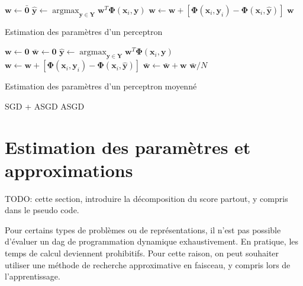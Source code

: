 \documentclass[11pt,openany]{book}
\newcommand{\ac}[1]{{\sc #1}} %
\begin{document}
\begin{algorithm}[htbp]
\begin{algorithmic}[1]
\State $\mathbf{w} \gets \bar{\mathbf{0}}$
\State
$\hat{\mathbf{y}} \gets \mathop{\text{argmax}}_{\mathbf{y}\in \mathbf{Y}} \mathbf{w}^T \boldsymbol\Phi(\mathbf{x}_i,\mathbf{y})$
\label{algoline-pseudoargmax}
     \State $\mathbf{w} \gets  \mathbf{w} +
     \left[\boldsymbol\Phi(\mathbf{x}_i,\mathbf{y}_i) 
       - \boldsymbol\Phi(\mathbf{x}_i,\hat{\mathbf{y}})  \right]$ 
     \label{algoline-update}
\EndIf
\EndFor
\EndFor
\State \Return $\mathbf{w}$
\EndFunction
\end{algorithmic}
\caption{\label{algo-perceptron-train}Estimation des paramètres d'un
  perceptron}
\end{algorithm}


\begin{algorithm}[htbp]
\begin{algorithmic}[1]
\State $\mathbf{w} \gets \mathbf{0}$
\State $\bar{\mathbf{w}} \gets \mathbf{0}$
\State $\hat{\mathbf{y}} \gets \mathop{\text{argmax}}_{\mathbf{y}\in \mathbf{Y}} \mathbf{w}^T \boldsymbol\Phi(\mathbf{x}_i,\mathbf{y})$
     \State $\mathbf{w} \gets  \mathbf{w} +
     \left[\boldsymbol\Phi(\mathbf{x}_i,\mathbf{y}_i) 
       - \boldsymbol\Phi(\mathbf{x}_i,\hat{\mathbf{y}})  \right]$ 
\EndIf
\State $\bar{\mathbf{w}} \gets \bar{\mathbf{w}}+\mathbf{w}$
\EndFor
\EndFor
\State \Return $\bar{\mathbf{w}}/N$
\EndFunction
\end{algorithmic}
\caption{\label{algo-perceptron-train-avg}Estimation des paramètres d'un
  perceptron moyenné}
\end{algorithm}

SGD + ASGD
ASGD

\section{Estimation des paramètres et approximations}

TODO: cette section, introduire la décomposition du score partout, y
compris dans le pseudo code.

Pour certains types de problèmes ou de représentations, il n'est pas
possible d'évaluer un \ac{dag} de programmation dynamique exhaustivement.
En pratique, les temps de calcul deviennent prohibitifs.
Pour cette raison, on peut souhaiter utiliser une méthode de recherche
approximative en faisceau, y compris lors de l'apprentissage.
\end{document}
